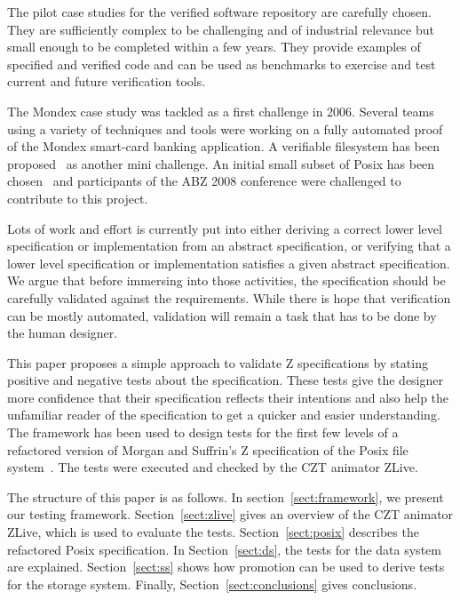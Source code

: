 \documentclass{llncs}
\begin{document}
The pilot case studies for the verified software repository are
carefully chosen.  They are sufficiently complex to be challenging and
of industrial relevance but small enough to be completed within a few
years.  They provide examples of specified and verified code and can
be used as benchmarks to exercise and test current and future
verification tools.

The Mondex case study was tackled as a first challenge in 2006.
Several teams using a variety of techniques and tools were working on
a fully automated proof of the Mondex smart-card banking application.
A verifiable filesystem has been proposed~\cite{JosHol07} as another
mini challenge.  An initial small subset of Posix has been
chosen~\cite{FreFuWoo07} and participants of the ABZ 2008 conference
were challenged to contribute to this project.

Lots of work and effort is currently put into either deriving a
correct lower level specification or implementation from an abstract
specification, or verifying that a lower level specification or
implementation satisfies a given abstract specification.  We argue
that before immersing into those activities, the specification should
be carefully validated against the requirements.  While there is hope
that verification can be mostly automated, validation will remain a
task that has to be done by the human designer.

This paper proposes a simple approach to validate Z specifications by
stating positive and negative tests about the specification.  These
tests give the designer more confidence that their specification
reflects their intentions and also help the unfamiliar reader of the
specification to get a quicker and easier understanding.  The
framework has been used to design tests for the first few levels of a
refactored version of Morgan and Suffrin's Z specification of the
Posix file system~\cite{MorSufTOSE84}.  The tests were executed and
checked by the CZT animator ZLive.

The structure of this paper is as follows.  In
section~\ref{sect:framework}, we present our testing framework.
Section~\ref{sect:zlive} gives an overview of the CZT animator ZLive,
which is used to evaluate the tests.  Section~\ref{sect:posix}
describes the refactored Posix specification.  In
Section~\ref{sect:ds}, the tests for the data system are explained.
Section~\ref{sect:ss} shows how promotion can be used to derive tests
for the storage system.  Finally, Section~\ref{sect:conclusions} gives
conclusions.
\end{document}
